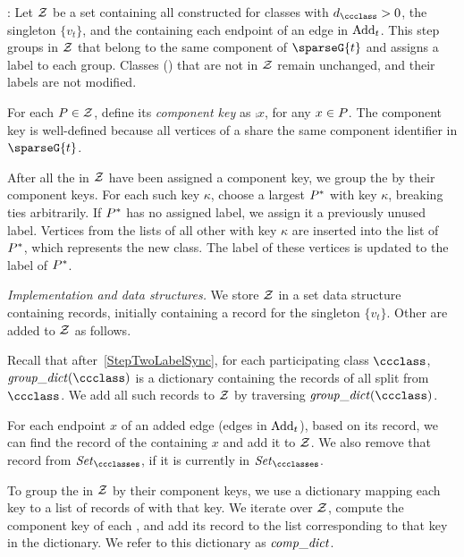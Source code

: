 \noindent{}:
Let $ \mathcal{Z} $ be a set containing all  constructed for classes with $ d_{\ccclass}>0 $, the singleton $ \{v_t\} $, and the  containing each endpoint of an edge in $ \mathrm{Add}_{t} $.
This step groups  in $ \mathcal{Z} $ that belong to the same component of $ \sparseG{t} $ and assigns a label to each group.
Classes () that are not in $ \mathcal{Z} $ remain unchanged, and their labels are not modified.

For each $ P \in \mathcal{Z} $, define its \emph{component key} as $ \comp{x} $, for any $ x\in P $.
The component key is well-defined because all vertices of a \piece{} share the same component identifier in $ \sparseG{t} $.

After all the  in $ \mathcal{Z} $ have been assigned a component key, we group the  by their component keys.
For each such key $ \kappa $, choose a largest \piece{} $ P^* $ with key $ \kappa $, breaking ties arbitrarily.
If $ P^* $ has no assigned label, we assign it a previously unused label.
Vertices from the lists of all other  with key $ \kappa $ are inserted into the list of $ P^{*} $, which represents the new class.
The label of these vertices is updated to the label of $ P^{*} $.

\textit{Implementation and data structures.}
We store $ \mathcal{Z} $ in a set data structure containing records, initially containing a record for the singleton $ \{v_t\} $.
Other  are added to $ \mathcal{Z} $ as follows.

Recall that after~\ref{StepTwoLabelSync}, for each participating class $ \ccclass $, $ \groupdict(\ccclass) $ is a dictionary containing the records of all  split from $ \ccclass $.
We add all such records to $ \mathcal{Z} $ by traversing $ \groupdict(\ccclass) $.

For each endpoint $ x $ of an added edge (edges in $ \mathrm{Add}_{t} $), based on its record, we can find the record of the \piece{} containing $ x $ and add it to $ \mathcal{Z} $.
We also remove that record from $ \setClasses $, if it is currently in $ \setClasses $.

To group the  in $ \mathcal{Z} $ by their component keys, we use a dictionary mapping each key to a list of records of  with that key.
We iterate over $ \mathcal{Z} $, compute the component key of each \piece{}, and add its record to the list corresponding to that key in the dictionary.
We refer to this dictionary as $ \mathit{comp\_dict} $.

